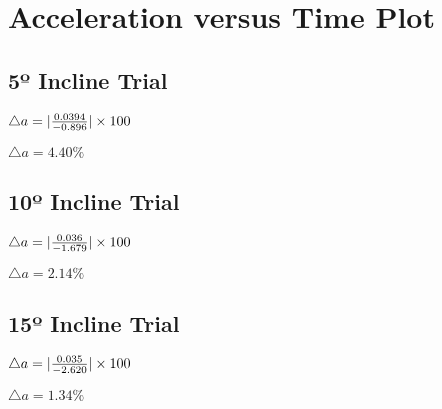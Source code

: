 \documentclass{article}
\begin{document}
\section{Acceleration versus Time Plot}
\subsection{5º Incline Trial}

$\triangle a = |\frac {0.0394}{-0.896}| \times {100}
\newline$



$\triangle a = {4.40} \%$
\newline
\subsection{10º Incline Trial}

$\triangle a = |\frac {0.036}{-1.679}| \times {100}
\newline$



$\triangle a = {2.14} \%$
\newline
\subsection{15º Incline Trial}

$\triangle a = |\frac {0.035}{-2.620}| \times {100}
\newline$



$\triangle a = {1.34} \%$
\end{document}
